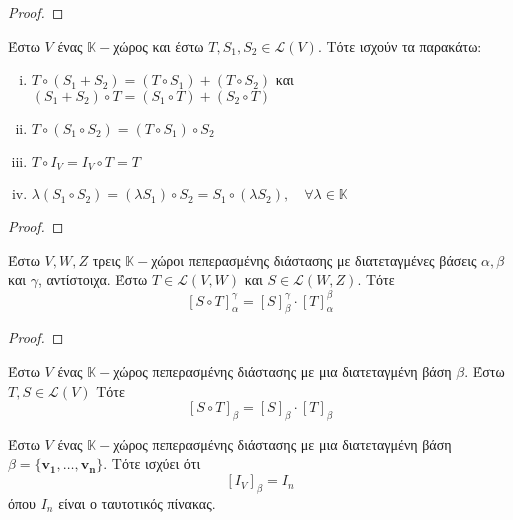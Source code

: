 \begin{proof}
\end{proof}

\begin{thm}
  Έστω $V$ ένας $ \mathbb{K}- $χώρος και έστω $ T, S_{1}, S_{2} \in \mathcal{L}(V) $. 
  Τότε ισχούν τα παρακάτω:
  \begin{enumerate}[i)]
    \item $ T \circ (S_{1}+S_{2}) = (T \circ S_{1}) + (T \circ S_{2}) $ \quad και \quad $
      (S_{1}+S_{2}) \circ T = (S_{1} \circ T) + (S_{2} \circ T) $
    \item $ T \circ (S_{1} \circ S_{2}) = (T \circ S_{1}) \circ S_{2} $
    \item $ T \circ I_{V} = I_{V} \circ T = T $
    \item $ \lambda (S_{1} \circ S_{2}) = (\lambda S_{1}) \circ S_{2} = S_{1} \circ
      (\lambda S_{2}), \quad \forall \lambda \in \mathbb{K} $
  \end{enumerate}
\end{thm}

\begin{proof}
\end{proof}

\begin{thm}\label{thm:linthm}
  Έστω $ V,W,Z $ τρεις $ \mathbb{K}- $χώροι πεπερασμένης διάστασης με διατεταγμένες 
  βάσεις $ \alpha, \beta $ και $\gamma$, αντίστοιχα. Έστω $ T \in \mathcal{L}(V,W) $ 
  και $ S \in \mathcal{L}(W,Z) $. Τότε
  \[
    [S \circ T]_{\alpha}^{\gamma} = [S]_{\beta}^{\gamma} \cdot [T]_{\alpha}^{\beta}
  \] 
\end{thm}

\begin{proof}
\end{proof}

\begin{cor}
  Έστω $V$ ένας $ \mathbb{K}- $χώρος πεπερασμένης διάστασης με μια διατεταγμένη βάση 
  $\beta$. Έστω $ T,S \in \mathcal{L}(V) $ Τότε
  \[
    [S \circ T]_{\beta} = [S]_{\beta} \cdot [T]_{\beta}
  \] 
\end{cor}

\begin{thm}
  Έστω $V$ ένας $ \mathbb{K}- $χώρος πεπερασμένης διάστασης με μια διατεταγμένη βάση 
  $ \beta = \{ \mathbf{v_{1}}, \ldots, \mathbf{v_{n}} \} $. Τότε 
  ισχύει ότι 
  \[
    [I_{V}]_{\beta} = I_{n}
  \] 
  όπου $ I_{n} $ είναι ο ταυτοτικός πίνακας.
\end{thm}

